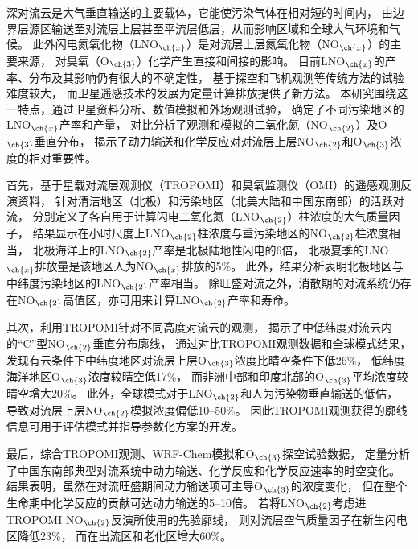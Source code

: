 
\abstract
{
深对流云是大气垂直输送的主要载体，它能使污染气体在相对短的时间内，
由边界层源区输送至对流层上层甚至平流层低层，从而影响区域和全球大气环境和气候。
此外闪电氮氧化物（LNO$_{\ch{x}}$）是对流层上层氮氧化物（NO$_{\ch{x}}$）的主要来源，
对臭氧（O$_{\ch{3}}$）化学产生直接和间接的影响。
目前LNO$_{\ch{x}}$的产率、分布及其影响仍有很大的不确定性，
基于探空和飞机观测等传统方法的试验难度较大，
而卫星遥感技术的发展为定量计算排放提供了新方法。
本研究围绕这一特点，通过卫星资料分析、数值模拟和外场观测试验，
确定了不同污染地区的LNO$_{\ch{x}}$产率和产量，
对比分析了观测和模拟的二氧化氮（NO$_{\ch{2}}$）及O$_{\ch{3}}$垂直分布，
揭示了动力输送和化学反应对对流层上层NO$_{\ch{2}}$和O$_{\ch{3}}$浓度的相对重要性。

首先，基于星载对流层观测仪（TROPOMI）和臭氧监测仪（OMI）的遥感观测反演资料，
针对清洁地区（北极）和污染地区（北美大陆和中国东南部）的活跃对流，
分别定义了各自用于计算闪电二氧化氮（LNO$_{\ch{2}}$）柱浓度的大气质量因子，
结果显示在小时尺度上LNO$_{\ch{2}}$柱浓度与重污染地区的NO$_{\ch{2}}$柱浓度相当，
北极海洋上的LNO$_{\ch{2}}$产率是北极陆地性闪电的6倍，
北极夏季的LNO$_{\ch{x}}$排放量是该地区人为NO$_{\ch{x}}$排放的5\%。
此外，结果分析表明北极地区与中纬度污染地区的LNO$_{\ch{2}}$产率相当。
除旺盛对流之外，消散期的对流系统仍存在NO$_{\ch{2}}$高值区，亦可用来计算LNO$_{\ch{2}}$产率和寿命。

其次，利用TROPOMI针对不同高度对流云的观测，
揭示了中低纬度对流云内的“C”型NO$_{\ch{2}}$垂直分布廓线，
通过对比TROPOMI观测数据和全球模式结果，
发现有云条件下中纬度地区对流层上层O$_{\ch{3}}$浓度比晴空条件下低26\%，
低纬度海洋地区O$_{\ch{3}}$浓度较晴空低17\%，
而非洲中部和印度北部的O$_{\ch{3}}$平均浓度较晴空增大20\%。
此外，全球模式对于LNO$_{\ch{2}}$和人为污染物垂直输送的低估，
导致对流层上层NO$_{\ch{2}}$模拟浓度偏低10--50\%。
因此TROPOMI观测获得的廓线信息可用于评估模式并指导参数化方案的开发。

最后，综合TROPOMI观测、WRF-Chem模拟和O$_{\ch{3}}$探空试验数据，
定量分析了中国东南部典型对流系统中动力输送、化学反应和化学反应速率的时空变化。
结果表明，虽然在对流旺盛期间动力输送项可主导O$_{\ch{3}}$的浓度变化，
但在整个生命期中化学反应的贡献可达动力输送的5--10倍。
若将LNO$_{\ch{2}}$考虑进TROPOMI NO$_{\ch{2}}$反演所使用的先验廓线，
则对流层空气质量因子在新生闪电区降低23\%，
而在出流区和老化区增大60\%。
}
